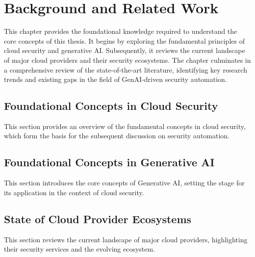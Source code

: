 
\chapter{Background and Related Work} %
\label{chap:Background and Related Work}

This chapter provides the foundational knowledge required to understand the core concepts of this thesis. It begins by exploring the fundamental principles of cloud security and generative AI. Subsequently, it reviews the current landscape of major cloud providers and their security ecosystems. The chapter culminates in a comprehensive review of the state-of-the-art literature, identifying key research trends and existing gaps in the field of GenAI-driven security automation.

\section{Foundational Concepts in Cloud Security} %
\label{sec:Foundational Concepts in Cloud Computing}

This section provides an overview of the fundamental concepts in cloud security, which form the basis for the subsequent discussion on security automation.


\section{Foundational Concepts in Generative AI} %
\label{sec:Foundational Concepts in Generative AI}

This section introduces the core concepts of Generative AI, setting the stage for its application in the context of cloud security.


\section{State of Cloud Provider Ecosystems} %
\label{sec:State of Cloud Provider Ecosystems}

This section reviews the current landscape of major cloud providers, highlighting their security services and the evolving ecosystem.


